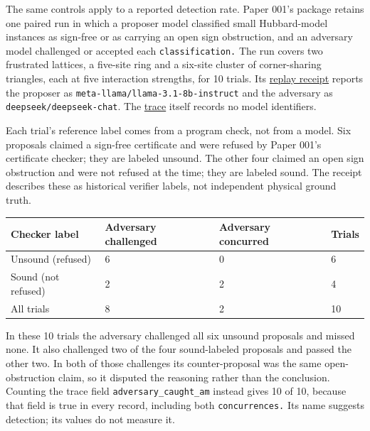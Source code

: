 \documentclass[
  11pt,
]{article}
\begin{document}
The same controls apply to a reported detection rate. Paper 001's
package retains one paired run in which a proposer model classified
small Hubbard-model instances as sign-free or as carrying an open sign
obstruction, and an adversary model challenged or accepted each
\nolinkurl{classification.} The run covers two frustrated lattices, a
five-site ring and a six-site cluster of corner-sharing triangles, each
at five interaction strengths, for 10 trials. Its
\href{https://github.com/dbccpage/the_symbol_game/blob/593230f7daba7aa04d7c41dd456dfbd00a39bcbd/atlas/coda_atlas/pfp/001_pfp_discrete_cochain_retraction_and_toy_involutions/results/demo2_r7_adversarial_debate_receipt.json}{replay
receipt} reports the proposer as
\nolinkurl{meta-llama/llama-3.1-8b-instruct} and the adversary as
\nolinkurl{deepseek/deepseek-chat}. The
\href{https://github.com/dbccpage/the_symbol_game/blob/593230f7daba7aa04d7c41dd456dfbd00a39bcbd/atlas/coda_atlas/pfp/001_pfp_discrete_cochain_retraction_and_toy_involutions/results/demo2_r7_adversarial_debate_1790210039.jsonl}{trace}
itself records no model identifiers.

Each trial's reference label comes from a program check, not from a
model. Six proposals claimed a sign-free certificate and were refused by
Paper 001's certificate checker; they are labeled unsound. The other
four claimed an open sign obstruction and were not refused at the time;
they are labeled sound. The receipt describes these as historical
verifier labels, not independent physical ground truth.

\begin{longtable}[]{@{}llll@{}}
\toprule\noalign{}
Checker label & Adversary challenged & Adversary concurred & Trials \\
\midrule\noalign{}
\endhead
\bottomrule\noalign{}
\endlastfoot
Unsound (refused) & 6 & 0 & 6 \\
Sound (not refused) & 2 & 2 & 4 \\
All trials & 8 & 2 & 10 \\
\end{longtable}

In these 10 trials the adversary challenged all six unsound proposals
and missed none. It also challenged two of the four sound-labeled
proposals and passed the other two. In both of those challenges its
counter-proposal was the same open-obstruction claim, so it disputed the
reasoning rather than the conclusion. Counting the trace field
\nolinkurl{adversary_caught_am} instead gives 10 of 10, because that
field is true in every record, including both \nolinkurl{concurrences.}
Its name suggests detection; its values do not measure it.
\end{document}
